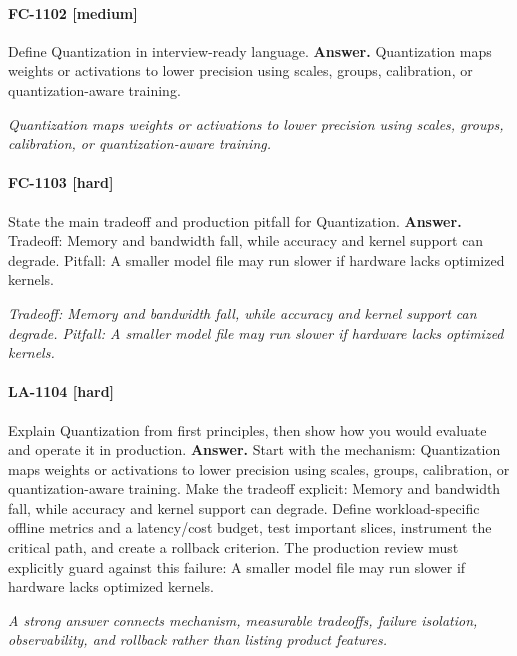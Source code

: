 \paragraph{FC-1102 [medium]} Define Quantization in interview-ready language.
\noindent\textbf{Answer.} Quantization maps weights or activations to lower precision using scales, groups, calibration, or quantization-aware training.
\par\textit{Quantization maps weights or activations to lower precision using scales, groups, calibration, or quantization-aware training.}
\paragraph{FC-1103 [hard]} State the main tradeoff and production pitfall for Quantization.
\noindent\textbf{Answer.} Tradeoff: Memory and bandwidth fall, while accuracy and kernel support can degrade. Pitfall: A smaller model file may run slower if hardware lacks optimized kernels.
\par\textit{Tradeoff: Memory and bandwidth fall, while accuracy and kernel support can degrade. Pitfall: A smaller model file may run slower if hardware lacks optimized kernels.}
\paragraph{LA-1104 [hard]} Explain Quantization from first principles, then show how you would evaluate and operate it in production.
\noindent\textbf{Answer.} Start with the mechanism: Quantization maps weights or activations to lower precision using scales, groups, calibration, or quantization-aware training. Make the tradeoff explicit: Memory and bandwidth fall, while accuracy and kernel support can degrade. Define workload-specific offline metrics and a latency/cost budget, test important slices, instrument the critical path, and create a rollback criterion. The production review must explicitly guard against this failure: A smaller model file may run slower if hardware lacks optimized kernels.
\par\textit{A strong answer connects mechanism, measurable tradeoffs, failure isolation, observability, and rollback rather than listing product features.}
